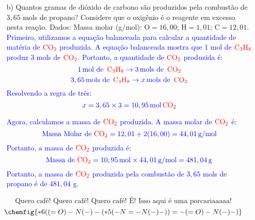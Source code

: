 \documentclass[a4paper, 12pt]{article}
\begin{document}
\begin{enumerate}
\begin{enumerate}[align=left, labelsep=-0.5em]
              \item[b)] Quantos gramas de dióxido de carbono são produzidos pela combustão
                    de $3,65$ mols de propano? Considere que o oxigênio é o reagente em
                    excesso nesta reação. Dados: Massa molar (g/mol): $\text{O}= 16,00$;
                    $\text{H}= 1,01$; $\text{C}= 12,01$.
                    \\[10pt]
                    \textcolor{blue}{Primeiro, utilizamos a equação balanceada para calcular a quantidade de matéria de \(\textcolor{red}{\text{CO}_{2}}\) produzida. A equação balanceada mostra que 1 mol de \(\textcolor{red}{\text{C}_{3}\text{H}_{8}}\) produz 3 mols de \(\textcolor{red}{\text{CO}_{2}}\). Portanto, a quantidade de \(\textcolor{red}{\text{CO}_{2}}\) produzida é:}
                    \[
                        \textcolor{blue}{1 \, \text{mol de } \, \textcolor{red}{\text{C}_{3}\text{H}_{8}} \rightarrow 3 \, \text{mols de } \, \textcolor{red}{\text{CO}_{2}}}
                    \]
                    \[
                        \textcolor{blue}{3,65 \, \text{mols de } \, \textcolor{red}{\text{C}_{3}\text{H}_{8}} \rightarrow x \, \text{mols de } \, \textcolor{red}{\text{CO}_{2}}}
                    \]
                    \textcolor{blue}{Resolvendo a regra de três:}
                    \[
                        \textcolor{blue}{x = 3,65 \times 3 = 10,95 \, \text{mol} \, \textcolor{red}{\text{CO}_{2}}}
                    \]

                    \textcolor{blue}{Agora, calculamos a massa de \(\textcolor{red}{\text{CO}_{2}}\) produzida. A massa molar de \(\textcolor{red}{\text{CO}_{2}}\) é:}
                    \[
                        \textcolor{blue}{\text{Massa Molar de } \textcolor{red}{\text{CO}_{2}} = 12,01 + 2(16,00) = 44,01 \, \text{g/mol}}
                    \]
                    \textcolor{blue}{Portanto, a massa de \(\textcolor{red}{\text{CO}_{2}}\) produzida é:}
                    \[
                        \textcolor{blue}{\text{Massa de } \textcolor{red}{\text{CO}_{2}} = 10,95 \, \text{mol} \times 44,01 \, \text{g/mol} = 481,04 \, \text{g}}
                    \]
                    \textcolor{blue}{Portanto, a massa de \(\textcolor{red}{\text{CO}_{2}}\) produzida pela combustão de $3,65$ mols de propano é de $481,04$ g.}
          \end{enumerate}

          \[
              \text{Quero café! Quero café! Quero café! É! Isso aqui é uma porcariaaaaa!}
          \]
          \[
              \chemfig{*6((=O)-N(-)-(*5(-N=-N(-)-))=-(=O)-N(-)-)}
          \]
\end{enumerate}
\end{document}
